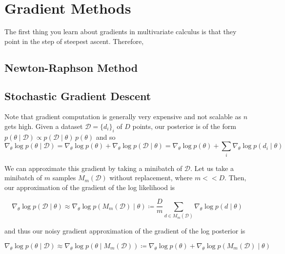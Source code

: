 \section{Gradient Methods} 

  The first thing you learn about gradients in multivariate calculus is that they point in the step of steepest ascent. Therefore, 

\subsection{Newton-Raphson Method}


\subsection{Stochastic Gradient Descent} 

  Note that gradient computation is generally very expensive and not scalable as $n$ gets high. Given a dataset $\mathcal{D} = \{d_i\}_i$ of $D$ points, our posterior is of the form $p(\theta \mid \mathcal{D}) \propto p(\mathcal{D} \mid \theta) \, p(\theta)$ and so 
  \begin{equation}
    \nabla_\theta \log p(\theta \mid \mathcal{D}) = \nabla_\theta \log{p(\theta)} + \nabla_\theta \log{p(\mathcal{D} \mid \theta)} = \nabla_\theta \log{p(\theta)} + \sum_i \nabla_\theta \log{p(d_i \mid \theta)}
  \end{equation}

  We can approximate this gradient by taking a minibatch of $\mathcal{D}$. Let us take a minibatch of $m$ samples $M_m (\mathcal{D})$ without replacement, where $m << D$. Then, our approximation of the gradient of the log likelihood is 

  \begin{equation}
    \nabla_\theta \log{p(\mathcal{D} \mid \theta)} \approx \nabla_\theta \log{p (M_m (\mathcal{D}) \mid \theta)} \coloneqq \frac{D}{m} \sum_{d \in M_m(\mathcal{D})} \nabla_\theta \log{p(d \mid \theta)}
  \end{equation}

  and thus our noisy gradient approximation of the gradient of the log posterior is 

  \begin{equation}
    \nabla_\theta \log{p(\theta \mid \mathcal{D})} \approx \nabla_\theta \log{p(\theta \mid M_m(\mathcal{D}))} \coloneqq \nabla_\theta \log{p(\theta)} + \nabla_\theta \log{p (M_m (\mathcal{D}) \mid \theta)}
  \end{equation}


